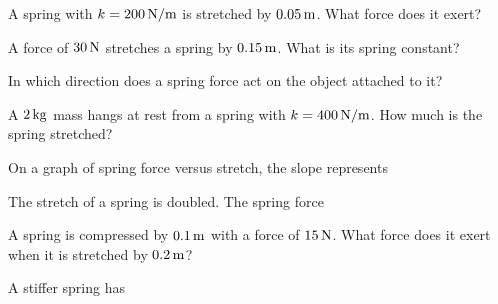 \begin{exo}{}
A spring with $k=200\,\mathrm{N/m}$ is stretched by $0.05\m$. What force does it exert?
\choices{$4000\N$}{$10\N$}{$40\N$}{$0.00025\N$}
\end{exo}
\begin{exo}{}
A force of $30\N$ stretches a spring by $0.15\,\mathrm{m}$. What is its spring constant?
\choices{$4.5\Nm$}{$0.005\Nm$}{$200\Nm$}{$20\Nm$}
\end{exo}
\begin{exo}{}
In which direction does a spring force act on the object attached to it?
\end{exo}
\begin{exo}{}
A $2\,\mathrm{kg}$ mass hangs at rest from a spring with $k=400\,\mathrm{N/m}$. How much is the spring stretched?
\choices{$0.05\m$}{$0.5\m$}{$5\m$}{$0.005\m$}
\end{exo}
\begin{exo}{}
On a graph of spring force versus stretch, the slope represents
\end{exo}
\begin{exo}{}
The stretch of a spring is doubled. The spring force
\end{exo}
\begin{exo}{}
A spring is compressed by $0.1\,\mathrm{m}$ with a force of $15\N$. What force does it exert when it is stretched by $0.2\,\mathrm{m}$?
\choices{$15\N$}{$7.5\N$}{$60\N$}{$30\N$}
\end{exo}
\begin{exo}{}
A stiffer spring has
\end{exo}
